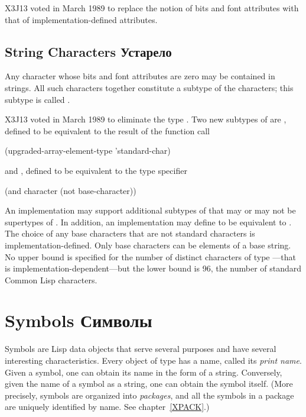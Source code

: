 \begin{newer}
X3J13 voted in March 1989 
to replace the notion of bits and font attributes with
that of implementation-defined attributes.
\end{newer}

\begin{obsolete}
\subsection{String Characters Устарело}

Any character whose bits and font attributes are zero may be contained
in strings.  All such characters together constitute a subtype of
the characters; this subtype is called .
\end{obsolete}


\begin{newer}
X3J13 voted in March 1989 
to eliminate the type .
Two new subtypes of  are ,
defined to be equivalent to the result of the function call
\begin{lisp}
(upgraded-array-element-type 'standard-char)
\end{lisp}
and , defined to be equivalent to the type specifier
\begin{lisp}
(and character (not base-character))
\end{lisp}
An implementation may support additional subtypes of 
that may or may not be supertypes of .
In addition, an implementation may define 
to be equivalent to .  The choice of any base characters
that are not standard characters is implementation-defined.
Only base characters can be elements of a base string.
No upper bound is specified for the number of distinct characters
of type ---that is implementation-dependent---but the lower
bound is 96, the number of standard Common Lisp characters.
\end{newer}

\section{Symbols Символы}

Symbols are Lisp data objects that serve several purposes
and have several interesting characteristics.  Every object of
type  has a name,
called its \emph{print name}.  Given a symbol, one can
obtain its name in the form of a string.  Conversely,
given the name of a symbol as a string, one can obtain the
symbol itself.  (More precisely, symbols are organized into
\emph{packages}, and all the symbols in a package are uniquely
identified by name.  See chapter~\ref{XPACK}.)

